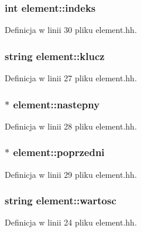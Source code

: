 \subsubsection[{indeks}]{\setlength{\rightskip}{0pt plus 5cm}int {\bf element\-::indeks}}\label{classelement_a0f38e724925a63611881cd67947d7878}


\-Definicja w linii 30 pliku element.\-hh.

\subsubsection[{klucz}]{\setlength{\rightskip}{0pt plus 5cm}string {\bf element\-::klucz}}\label{classelement_ae428dec26f3fcde9f8990b904a144e37}


\-Definicja w linii 27 pliku element.\-hh.

\subsubsection[{nastepny}]{$\ast$ {\bf element\-::nastepny}}\label{classelement_ab6df52b0e5cfa7c4998a2ab74a8ef53e}


\-Definicja w linii 28 pliku element.\-hh.

\subsubsection[{poprzedni}]{$\ast$ {\bf element\-::poprzedni}}\label{classelement_ab29a484726350416708a843bc30aa4fa}


\-Definicja w linii 29 pliku element.\-hh.

\subsubsection[{wartosc}]{\setlength{\rightskip}{0pt plus 5cm}string {\bf element\-::wartosc}\hspace{0.3cm}{\ttfamily  [private]}}\label{classelement_ae33073625c349adb76caf9b5e0df0134}


\-Definicja w linii 24 pliku element.\-hh.

